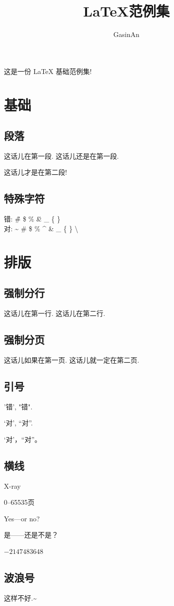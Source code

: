 \documentclass{ctexart}
\title{\LaTeX{}范例集}
\author{GasinAn}
\begin{document}
    \maketitle
    这是一份 \LaTeX{} 基础范例集!
    \section{基础}
    \subsection{段落}
    这话儿在第一段.
    这话儿还是在第一段.

    这话儿才是在第二段!
    \subsection{特殊字符}
    错: \~ \# \$ \% \^ \& \_ \{ \} \\
    对: \~{} \#{} \${} \%{} \^{} \&{} \_{} \{{} \}{} \textbackslash{}
    \section{排版}
    \subsection{强制分行}
    这话儿在第一行.\newline
    这话儿在第二行.
    \subsection{强制分页}
    这话儿如果在第一页.\newpage
    这话儿就一定在第二页.
    \subsection{引号}
    '错', "错".

    `对', ``对''.

    ‘对’，“对”。
    \subsection{横线}
    X-ray

    0--65535页

    Yes---or no?

    是——还是不是？

    $-2147483648$
    \subsection{波浪号}
    这样不好.\~{}
\end{document}
